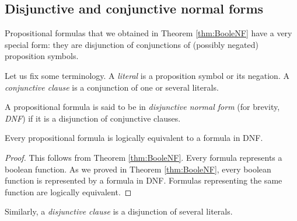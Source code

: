 \begin{page}
\setcounter{section}{1}
\setcounter{subsection}{5}
\setcounter{dfn}{15}
\label{portion:398}

\subsection{Disjunctive and conjunctive normal forms}
Propositional formulas that we obtained in Theorem \ref{thm:BooleNF} have a very special form:
they are disjunction of conjunctions of (possibly negated) proposition symbols.

Let us fix some terminology.
A \emph{literal} is a proposition symbol or its negation.
A \emph{conjunctive clause} is a conjunction of one or several literals.


\end{page}

\begin{page}
\setcounter{section}{1}
\setcounter{subsection}{5}
\setcounter{dfn}{16}
\label{portion:400}

\begin{dfn}
A propositional formula is said to be in \emph{disjunctive normal form} (for brevity, \emph{DNF})
if it is a disjunction of conjunctive clauses.
\end{dfn}

\end{page}

\begin{page}
\setcounter{section}{1}
\setcounter{subsection}{5}
\setcounter{dfn}{17}
\label{portion:403}

\begin{cor}
\label{cor:DNF}
Every propositional formula is logically equivalent to a formula in DNF.
\end{cor}

\end{page}

\begin{page}
\setcounter{section}{1}
\setcounter{subsection}{5}
\setcounter{dfn}{17}
\label{portion:404}

\begin{proof}
This follows from Theorem \ref{thm:BooleNF}.
Every formula represents a boolean function.
As we proved in Theorem \ref{thm:BooleNF}, every boolean function is represented by a formula in DNF.
Formulas representing the same function are logically equivalent.
\end{proof}

Similarly, a \emph{disjunctive clause} is a disjunction of several literals.

\end{page}

